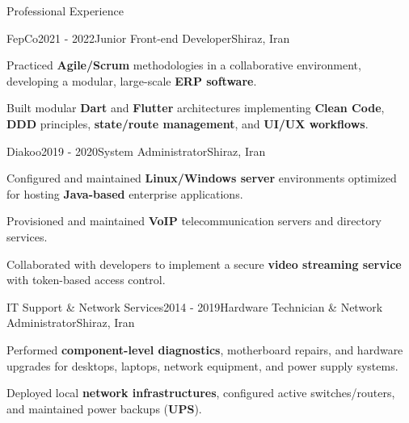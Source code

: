 \documentclass[
	a4paper, %
	12pt, %
]{resume} %
\begin{document}
\begin{rSection}{Professional Experience}
	\begin{rSubsection}{FepCo}{2021 - 2022}{Junior Front-end Developer}{Shiraz, Iran}
		\item Practiced \textbf{Agile/Scrum} methodologies in a collaborative environment, developing a modular, large-scale \textbf{ERP software}.
		\item Built modular \textbf{Dart} and \textbf{Flutter} architectures implementing \textbf{Clean Code}, \textbf{DDD} principles, \textbf{state/route management}, and \textbf{UI/UX workflows}.
        \\       
	\end{rSubsection}


	\begin{rSubsection}{Diakoo}{2019 - 2020}{System Administrator}{Shiraz, Iran}
		\item Configured and maintained \textbf{Linux/Windows server} environments optimized for hosting \textbf{Java-based} enterprise applications.
		\item Provisioned and maintained \textbf{VoIP} telecommunication servers and directory services.
		\item Collaborated with developers to implement a secure \textbf{video streaming service} with token-based access control.
        \\      
	\end{rSubsection}

	\begin{rSubsection}{IT Support \& Network Services}{2014 - 2019}{Hardware Technician \& Network Administrator}{Shiraz, Iran}
		\item Performed \textbf{component-level diagnostics}, motherboard repairs, and hardware upgrades for desktops, laptops, network equipment, and power supply systems.
		\item Deployed local \textbf{network infrastructures}, configured active switches/routers, and maintained power backups (\textbf{UPS}).
        \\    
	\end{rSubsection}
\end{rSection}



\end{document}
